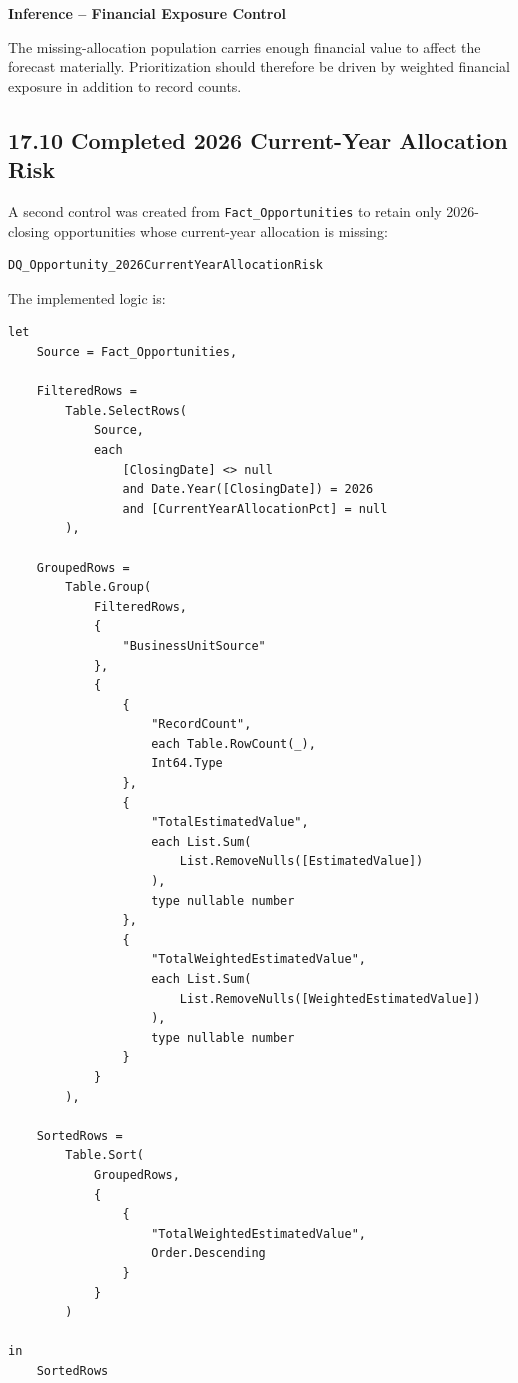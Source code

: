 \documentclass[11pt,a4paper]{article}
\begin{document}
\begin{inferencebox}

\textbf{Inference -- Financial Exposure Control}

The missing-allocation population carries enough financial value to affect the
forecast materially. Prioritization should therefore be driven by weighted
financial exposure in addition to record counts.

\end{inferencebox}

\subsection{17.10 Completed 2026 Current-Year Allocation Risk}

A second control was created from \texttt{Fact\_Opportunities} to retain only
2026-closing opportunities whose current-year allocation is missing:

\begin{lstlisting}[style=powerquery]
DQ_Opportunity_2026CurrentYearAllocationRisk
\end{lstlisting}

The implemented logic is:

\begin{lstlisting}[style=powerquery]
let
    Source = Fact_Opportunities,

    FilteredRows =
        Table.SelectRows(
            Source,
            each
                [ClosingDate] <> null
                and Date.Year([ClosingDate]) = 2026
                and [CurrentYearAllocationPct] = null
        ),

    GroupedRows =
        Table.Group(
            FilteredRows,
            {
                "BusinessUnitSource"
            },
            {
                {
                    "RecordCount",
                    each Table.RowCount(_),
                    Int64.Type
                },
                {
                    "TotalEstimatedValue",
                    each List.Sum(
                        List.RemoveNulls([EstimatedValue])
                    ),
                    type nullable number
                },
                {
                    "TotalWeightedEstimatedValue",
                    each List.Sum(
                        List.RemoveNulls([WeightedEstimatedValue])
                    ),
                    type nullable number
                }
            }
        ),

    SortedRows =
        Table.Sort(
            GroupedRows,
            {
                {
                    "TotalWeightedEstimatedValue",
                    Order.Descending
                }
            }
        )

in
    SortedRows
\end{lstlisting}
\end{document}
